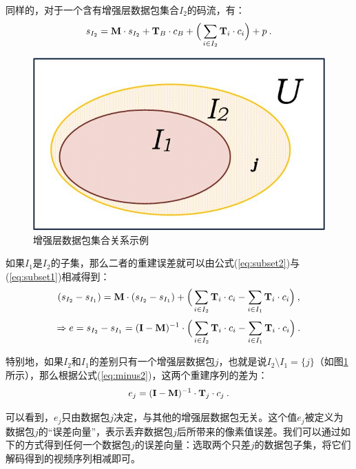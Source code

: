 同样的，对于一个含有增强层数据包集合$I_2$的码流，有：
\begin{equation}
\vspace{10pt}
\label{eq:subset2}
s_{I_2} = {\rm\bf M} \cdot s_{I_2} + {\rm\bf T}_{B} \cdot c_{B} + \Big( \sum_{i \in I_2}{\rm\bf T}_i \cdot c_i \Big) + p \: .
\end{equation}

\begin{figure}[t]
	\centering
	\vspace{10pt}
	\includegraphics[width = 0.5\linewidth]{figures/subset.jpg}
	\vspace{10pt}
	\caption{增强层数据包集合关系示例 \label{fig:subset}}
\end{figure}

如果$I_1$是$I_2$的子集，那么二者的重建误差就可以由公式(\ref{eq:subset2})与(\ref{eq:subset1})相减得到：
\begin{equation}
\vspace{10pt}
\label{eq:minus1}
(s_{I_2} - s_{I_1}) = {\rm\bf M} \cdot (s_{I_2} - s_{I_1}) + \Big( \sum_{i \in I_2}{\rm\bf T}_i \cdot c_i - \sum_{i \in I_1}{\rm\bf T}_i \cdot c_i \Big) \: ,
\end{equation}
\begin{equation}
\vspace{10pt}
\label{eq:minus2}
\Rightarrow e = s_{I_2} - s_{I_1} = ({\rm\bf I - M})^{-1} \cdot \Big( \sum_{i \in I_2}{\rm\bf T}_i \cdot c_i - \sum_{i \in I_1}{\rm\bf T}_i \cdot c_i \Big) \: .
\end{equation}

特别地，如果$I_2$和$I_1$的差别只有一个增强层数据包$j$，也就是说$I_2 \setminus I_1 = \{j\}$（如图\ref{fig:subset}所示），那么根据公式(\ref{eq:minus2})，这两个重建序列的差为：
\begin{equation}
\vspace{10pt}
\label{eq:error_j}
e_j = ({\rm\bf I - M})^{-1} \cdot {\rm\bf T}_j \cdot c_j \: .
\end{equation}

可以看到，$e_j$只由数据包$j$决定，与其他的增强层数据包无关。这个值$e_j$被定义为数据包$j$的“误差向量”，表示丢弃数据包$j$后所带来的像素值误差。我们可以通过如下的方式得到任何一个数据包$j$的误差向量：选取两个只差$j$的数据包子集，将它们解码得到的视频序列相减即可。

